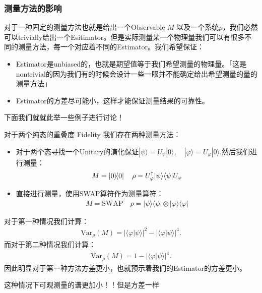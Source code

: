 \subsubsection{测量方法的影响}

对于一种固定的测量方法也就是给出一个Observable $ M $ 以及一个系统$
\rho$，我们必然可以trivially给出一个Esitimator。但是实际测量某一个物理量我们可以有很多不同的测量方法，每一个对应着不同的Estimator。我们希望保证：
\begin{itemize}
  \item
    Estimator是unbiased的，也就是期望值等于我们希望测量的物理量。「这是nontrivial的因为我们有的时候会设计一些一眼并不能确定给出希望测量的量的测量方法」
  \item Estimator的方差尽可能小，这样才能保证测量结果的可靠性。
\end{itemize}
下面我们就就此举一些例子进行讨论！

\bigskip
{}

对于两个纯态的重叠度 Fidelity 我们存在两种测量方法：
\begin{itemize}
  \item 对于两个态寻找一个Unitary的演化保证$
    |\psi\rangle=U_\psi|0\rangle,\quad|\varphi\rangle=U_\varphi|0\rangle.
    $然后我们进行测量：
    \begin{align}
      M = \left| 0 \middle\rangle\!\middle\langle 0 \right| \quad \rho =
      U_\varphi^\dagger|\psi\rangle\langle\psi|U_\varphi
    \end{align}
  \item 直接进行测量，使用SWAP算符作为测量算符：
    \begin{align}
      M = \mathrm{SWAP} \quad \rho = |\psi\rangle\langle\psi| \otimes
      |\varphi\rangle\langle\varphi|
    \end{align}
\end{itemize}
对于第一种情况我们计算：
\begin{align}
  \mathrm{Var}_\rho(M) =
  \left|\langle\varphi|\psi\rangle\right|^2-\left|\langle\varphi|\psi\rangle\right|^4.
\end{align}
而对于第二种情况我们计算：
\begin{align}
  \mathrm{Var}_\rho(M)=1-\left|\langle\varphi|\psi\rangle\right|^4.
\end{align}
因此明显对于第一种方法方差更小，也就预示着我们的Estimator的方差更小。

\bigskip
{}

这种情况下可观测量的谱更加小！！但是方差一样
\YL{[回头补充]}

